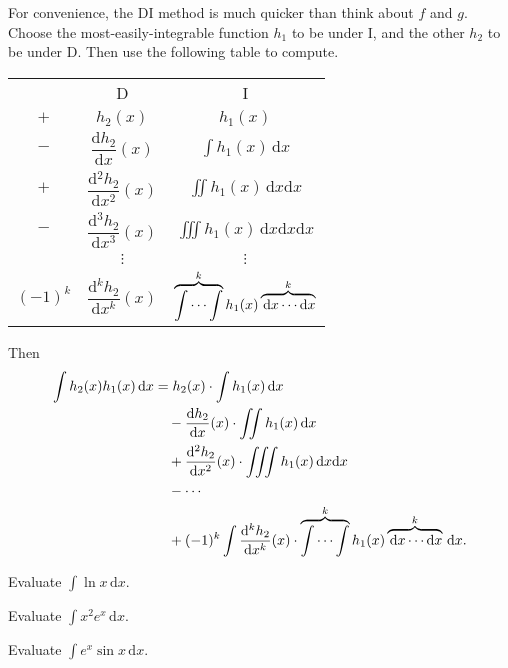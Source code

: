 \documentclass[11pt]{article}
\theoremstyle{break}
\theoremstyle{no_label}
\newcommand{\derivative}[2]{\dfrac{\dd{#1}}{\dd{#2}}}
\newcommand{\dd}{\text{d}}
\newcommand{\ddi}{\text{$\,$d}}
\numberwithin{equation}{theorem}
\begin{document}
\begin{remark}[DI Method]
    For convenience, the DI method is much quicker than think about $f$ and $g$. Choose the most-easily-integrable function $h_1$ to be under I, and the other $h_2$ to be under D. Then use the following table to compute.
    
    \begin{center}
        \begin{tabular}{c c c}
            & D & I \\
            $+$ & $h_2(x)$ & $h_1(x)$ \\
            $-$ & $\derivative{h_2}{x}(x)$ & $\displaystyle\int h_1(x)\ddi x$ \\
            $+$ & $\derivative{^2h_2}{x^2}(x)$ & $\displaystyle\iint h_1(x)\ddi x\dd x$ \\
            $-$ & $\derivative{^3h_2}{x^3}(x)$ & $\displaystyle\iiint h_1(x)\ddi x\dd x\dd x$ \\
            & $\vdots$ & $\vdots$ \\
            $(-1)^{k}$ & $\derivative{^kh_2}{x^k}(x)$ & $\displaystyle\overbrace{\idotsint}^k h_1(x)\overbrace{\ddi x\cdots\dd x}^k$ \\
        \end{tabular}
    \end{center}
    Then \begin{align*}
        \int h_2(x)h_1(x)\ddi x&=h_2(x)\cdot\int h_1(x)\ddi x\\
        &\quad-\derivative{h_2}{x}(x)\cdot\iint h_1(x)\ddi x\\
        &\quad+\derivative{^2h_2}{x^2}(x)\cdot\iiint h_1(x)\ddi x\dd x\\
        &\quad-\cdots\\
        &\quad+(-1)^k\int\derivative{^kh_2}{x^k}(x)\cdot\overbrace{\idotsint}^k h_1(x)\overbrace{\ddi x\cdots\dd x}^k\ddi x.
    \end{align*}
\end{remark}

\begin{example}
    Evaluate $\displaystyle\int\ln x\ddi x$.
\end{example}


\begin{example}
    Evaluate $\displaystyle\int x^2e^x\ddi x$.
\end{example}


\begin{example}
    Evaluate $\displaystyle\int e^x\sin x\ddi x$.
\end{example}
\end{document}
